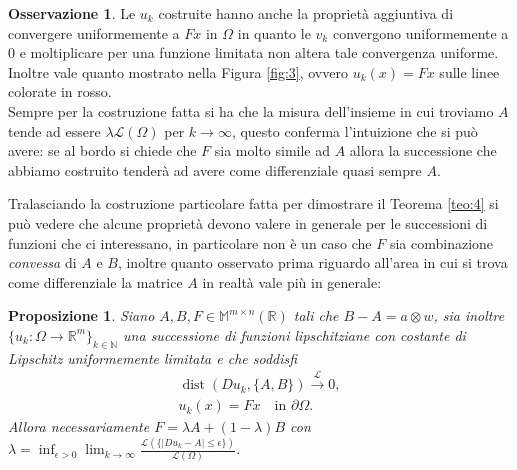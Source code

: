 \documentclass[a4paper,11pt]{book}
\theoremstyle{plain}
\newtheorem{prop}[teo]{Proposizione}
\theoremstyle{definition}
\newtheorem{oss}[defn]{Osservazione}
\theoremstyle{remark}
\newcommand{\R}{\mathbb{R}}
\newcommand{\N}{\mathbb{N}}
\newcommand{\M}{\mathbb{M}}
\newcommand{\LL}{\mathscr{L}}
\DeclareMathOperator{\dist}{dist}
\begin{document}
\begin{oss}\label{oss:1}
	Le $u_k$ costruite hanno anche la proprietà aggiuntiva di convergere uniformemente a $Fx$ in $\Omega$ in quanto le $v_k$ convergono uniformemente a $0$ e moltiplicare per una funzione limitata non altera tale convergenza uniforme. Inoltre vale quanto mostrato nella Figura \ref{fig:3}, ovvero $u_k(x) = Fx$ sulle linee colorate in rosso.\\
	Sempre per la costruzione fatta si ha che la misura dell'insieme in cui troviamo $A$ tende ad essere $\lambda\LL(\Omega)$ per $k\to\infty$, questo conferma l'intuizione che si può avere: se al bordo si chiede che $F$ sia molto simile ad $A$ allora la successione che abbiamo costruito tenderà ad avere come differenziale quasi sempre $A$.
\end{oss}


Tralasciando la costruzione particolare fatta per dimostrare il Teorema \ref{teo:4} si può vedere che alcune proprietà devono valere in generale per le successioni di funzioni che ci interessano, in particolare non è un caso che $F$ sia combinazione \textit{convessa} di $A$ e $B$, inoltre quanto osservato prima riguardo all'area in cui si trova come differenziale la matrice $A$ in realtà vale più in generale:
\begin{prop}\label{prop:1}
	Siano $A,B,F\in \M^{m\times n}(\R)$ tali che $B-A=a\otimes w$, sia inoltre $\{u_k:\Omega\to\R^m\}_{k\in\N}$ una successione di funzioni lipschitziane con costante di Lipschitz uniformemente limitata e che soddisfi
	\begin{gather*}
		\dist(Du_k,\{A,B\})\xrightarrow{\LL} 0,\\
		u_k(x) = Fx \quad\text{in }\partial \Omega.
	\end{gather*}
	Allora necessariamente $F=\lambda A+(1-\lambda)B$ con $\displaystyle\lambda = \inf_{\epsilon>0}\lim_{k\to\infty}\frac{\LL(\{|Du_k - A|\leq \epsilon\})}{\LL(\Omega)}$.
\end{prop}
\end{document}
